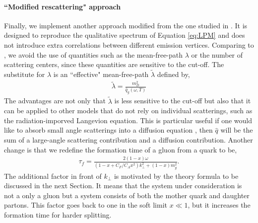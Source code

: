 \documentclass[aps, prc, reprint, amsmath, groupedaddress, nofootinbib]{revtex4-1}
\begin{document}
\paragraph*{``Modified rescattering" approach} Finally, we implement another approach modified from the one studied in \cite{Zapp:2011ya,Park:thesis,Park:2016jap}.
It is designed to reproduce the qualitative spectrum of Equation \ref{eq:LPM} and does not introduce extra correlations between different emission vertices. 
Comparing to \cite{Zapp:2011ya}, we avoid the use of quantities such as the mean-free-path $\lambda$ or the number of scattering centers, since these quantities are sensitive to the cut-off. 
The substitute for $\lambda$ is an ``effective" mean-free-path $\tilde{\lambda}$ defined by,
\begin{eqnarray}\label{eq:effmpf}
\tilde{\lambda} = \frac{m_D^2}{\hat{q}_g(\omega, T)}
\end{eqnarray}
The advantages are not only that $\tilde{\lambda}$ is less sensitive to the cut-off but also that it can be applied to other models that do not rely on individual scatterings, such as the radiation-imporved Langevion equation.
This is particular useful if one would like to absorb small angle scatterings into a diffusion equation \cite{Ghiglieri:2015ala}, then $\hat{q}$ will be the sum of a large-angle scattering contribution and a diffusion contribution.
Another change is that we redefine the formation time of a gluon from a quark to be,
\begin{eqnarray}\label{eq:formation-time-def}
\tau_f = \frac{2(1-x)\omega}{\left(1-x+C_F/C_A x^2\right)k_\perp^2 + (1-x)m_g^2}.
\end{eqnarray}
The additional factor in front of $k_\perp$ is motivated by the theory formula to be discussed in the next Section.
It means that the system under consideration is not a only a gluon but a system consists of both the mother quark and daughter partons. 
This factor goes back to one in the soft limit $x\ll 1$, but it increases the formation time for harder splitting. 
\end{document}
